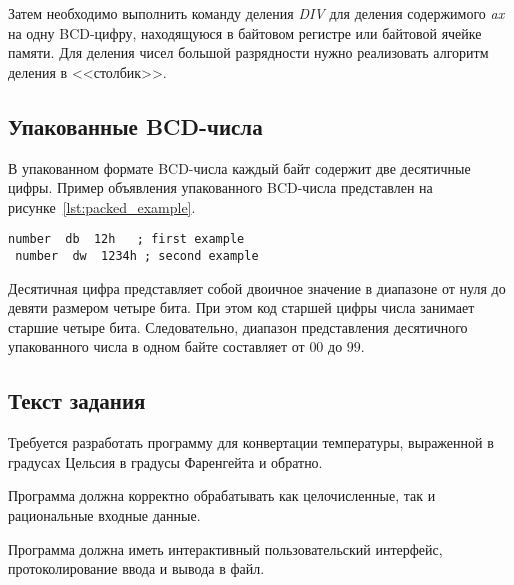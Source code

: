 Затем необходимо выполнить команду деления \textit{DIV} для деления содержимого
\textit{ax} на одну BCD-цифру, находящуюся в байтовом регистре или байтовой ячейке памяти.
Для деления чисел большой разрядности нужно реализовать алгоритм деления в <<столбик>>.

\subsection{Упакованные BCD-числа}
\label{sub:packed}

В упакованном формате BCD-числа каждый байт содержит две десятичные цифры.
Пример объявления упакованного BCD-числа представлен
на рисунке~\ref{lst:packed_example}.

\begin{lstlisting}[caption=Пример объявления упакованного BCD-числа,label=lst:packed_example,
language={[x86masm]Assembler}]
 number  db  12h   ; first example
 number  dw  1234h ; second example
\end{lstlisting}


Десятичная цифра представляет собой двоичное значение в диапазоне от нуля до девяти
размером четыре бита. При этом код старшей цифры числа занимает старшие четыре бита.
Следовательно, диапазон представления десятичного упакованного числа в одном байте
составляет от $ 00 $ до $ 99 $. 





\subsection{Текст задания}

Требуется разработать программу для конвертации температуры, выраженной 
в градусах Цельсия в градусы Фаренгейта и обратно.

Программа должна корректно обрабатывать как целочисленные,
так и рациональные входные данные.

Программа должна иметь интерактивный пользовательский интерфейс,
протоколирование ввода и вывода в файл.

\newpage
